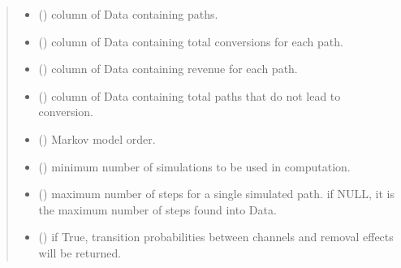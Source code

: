 \documentclass[letterpaper,10pt,english]{sphinxmanual}
\begin{document}
\begin{fulllineitems}
\begin{quote}
\begin{description}
\begin{itemize}
\item {} 
\sphinxAtStartPar
{} () \textendash{} column of Data containing paths.

\item {} 
\sphinxAtStartPar
{} () \textendash{} column of Data containing total conversions for each path.

\item {} 
\sphinxAtStartPar
{} (\sphinxstyleliteralemphasis{\sphinxupquote{, }}\sphinxstyleliteralemphasis{\sphinxupquote{, }}) \textendash{} column of Data containing revenue for each path.

\item {} 
\sphinxAtStartPar
{} () \textendash{} column of Data containing total paths that do not lead to conversion.

\item {} 
\sphinxAtStartPar
{} (\sphinxstyleliteralemphasis{\sphinxupquote{, }}) \textendash{} Markov model order.

\item {} 
\sphinxAtStartPar
{} (\sphinxstyleliteralemphasis{\sphinxupquote{, }}) \textendash{} minimum number of simulations to be used in computation.

\item {} 
\sphinxAtStartPar
{} (\sphinxstyleliteralemphasis{\sphinxupquote{, }}) \textendash{} maximum number of steps for a single simulated path. if NULL, it is the maximum number of steps found into Data.

\item {} 
\sphinxAtStartPar
{} (\sphinxstyleliteralemphasis{\sphinxupquote{, }}) \textendash{} if True, transition probabilities between channels and removal effects will be returned.


\end{itemize}
\end{description}
\end{quote}
\end{fulllineitems}
\end{document}
